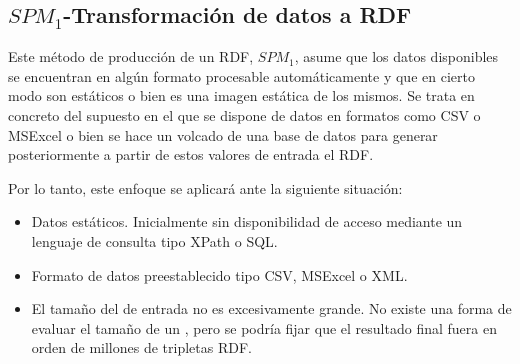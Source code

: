 \subsection{$SPM_1$-Transformación de datos a RDF}\label{spm-1}
Este método de producción de un \dataset \gls{RDF}, $SPM_1$, asume que los datos disponibles se encuentran
en algún formato procesable automáticamente y que en cierto modo son estáticos o bien
es una imagen estática de los mismos. Se trata en concreto del supuesto en el que se dispone de datos en formatos
como \gls{CSV} o MSExcel o bien se hace un volcado de una base de datos para generar posteriormente a partir
de estos valores de entrada el \dataset RDF. 

Por lo tanto, este enfoque se aplicará ante la siguiente situación:
\begin{itemize}
 \item Datos estáticos. Inicialmente sin disponibilidad de acceso mediante un lenguaje de consulta tipo \gls{XPath} o \gls{SQL}.
 \item Formato de datos preestablecido tipo CSV, MSExcel o \gls{XML}.
 \item El tamaño del \dataset de entrada no es excesivamente grande. No existe una forma de evaluar el tamaño
de un \dataset, pero se podría fijar que el resultado final fuera en orden de millones de tripletas RDF.
\end{itemize}


